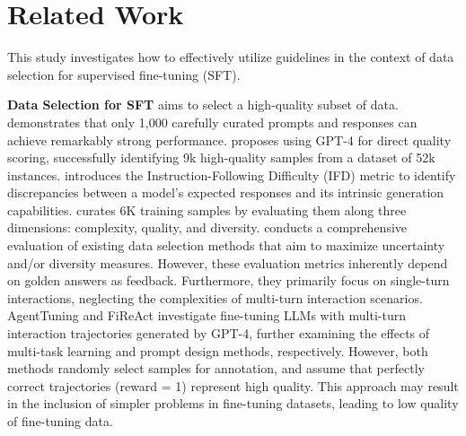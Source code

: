 




\section{Related Work}

This study investigates how to effectively utilize guidelines in the context of data selection for supervised fine-tuning (SFT).

\textbf{Data Selection for SFT} aims to select a high-quality subset of data. 
\cite{Zhou-Chunting-NeurIPS-2023-LIMA} demonstrates that only 1,000 carefully curated prompts and responses can achieve remarkably strong performance.
\cite{Chen-Lichang-ICLR-2024-AlpaGasus} proposes using GPT-4 for direct quality scoring, successfully identifying 9k high-quality samples from a dataset of 52k instances.
\cite{Li-Ming-NAACL-2024-IFD} introduces the Instruction-Following Difficulty (IFD) metric to identify discrepancies between a model's expected responses and its intrinsic generation capabilities.
\cite{Liu-Wei-ICLR-2024-DEITA} curates 6K training samples by evaluating them along three dimensions: complexity, quality, and diversity.
\cite{Bhatt-Gantavya-ACL-2024-ExperimentalDesign} conducts a comprehensive evaluation of existing data selection methods that aim to maximize uncertainty and/or diversity measures.
However, these evaluation metrics inherently depend on golden answers as feedback. Furthermore, they primarily focus on single-turn interactions, neglecting the complexities of multi-turn interaction scenarios.
AgentTuning \cite{zeng-etal-2024-agenttuning} and FiReAct \cite{Chen-Baian-2023-FireAct} investigate fine-tuning LLMs with multi-turn interaction trajectories generated by GPT-4, further examining the effects of multi-task learning and prompt design methods, respectively.
However, both methods randomly select samples for annotation, and assume that perfectly correct trajectories (reward = 1) represent high quality. This approach may result in the inclusion of simpler problems in fine-tuning datasets, leading to low quality of fine-tuning data. 


